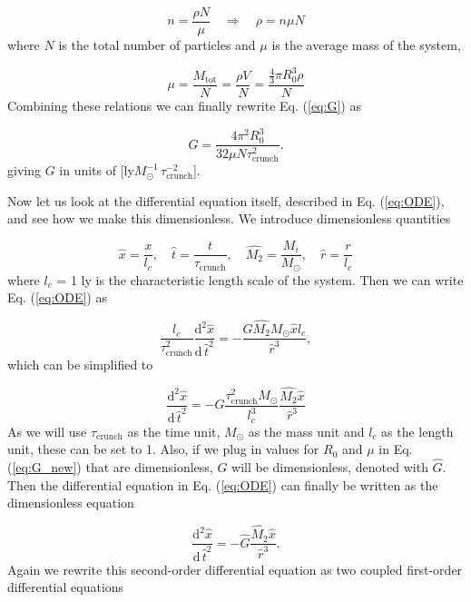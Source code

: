 \documentclass{article}
\begin{document}
\begin{multicols}{2}
\begin{equation*}
	n = \frac{\rho N}{\mu} \quad \Rightarrow \quad \rho = n \mu N
\end{equation*}
where $N$ is the total number of particles and $\mu$ is the average mass of the system,

\begin{equation*}
	\mu = \frac{M_{\mathrm{tot}}}{N} = \frac{\rho V}{N} = \frac{\frac{4}{3} \pi R_0^3 \rho}{N}
\end{equation*}
Combining these relations we can finally rewrite Eq. (\ref{eq:G}) as 

\begin{equation}\label{eq:G_new}
	G = \frac{4 \pi^2 R_0^3}{32 \mu N \tau_{\mathrm{crunch}}^2}.
\end{equation}
giving $G$ in units of [ly$M_{\odot}^{-1} \, \tau_{\mathrm{crunch}}^{-2}$].

Now let us look at the differential equation itself, described in Eq. (\ref{eq:ODE}), and see how we make this dimensionless. We introduce dimensionless quantities

\begin{equation*}
	\hat{x} = \frac{x}{l_c}, \quad \hat{t} = \frac{t}{\tau_{\mathrm{crunch}}}, \quad \hat{M_2} = \frac{M_i}{M_{\odot}}, \quad \hat{r} = \frac{r}{l_c}
\end{equation*} 
where $l_c$ = 1 ly is the characteristic length scale of the system. Then we can write Eq. (\ref{eq:ODE}) as

\begin{equation*}
	\frac{l_c}{\tau_{\mathrm{crunch}}^2} \frac{\mathrm{d}^2 \hat{x}}{\mathrm{d} \, \hat{t}^2} = - \frac{G \hat{M_2} M_{\odot} \hat{x} l_c}{\hat{r}^3},
\end{equation*}
which can be simplified to

\begin{equation*}
	\frac{\mathrm{d}^2 \hat{x}}{\mathrm{d} \, \hat{t}^2} = - G \frac{\tau_{\mathrm{crunch}}^2 M_{\odot}}{l_c^3}  \frac{\hat{M_2} \hat{x}}{\hat{r}^3}
\end{equation*}
As we will use $\tau_{\mathrm{crunch}}$ as the time unit, $M_{\odot}$ as the mass unit and $l_c$ as the length unit, these can be set to 1. Also, if we plug in values for $R_0$ and $\mu$ in Eq. (\ref{eq:G_new}) that are dimensionless, $G$ will be dimensionless, denoted with $\hat{G}$. Then the differential equation in Eq. (\ref{eq:ODE}) can finally be written as the dimensionless equation

\begin{equation}\label{eq:ODE_new}
	\frac{\mathrm{d}^2 \hat{x}}{\mathrm{d} \, \hat{t}^2} = - \hat{G} \frac{\hat{M_2} \hat{x}}{\hat{r}^3}.
\end{equation}
Again we rewrite this second-order differential equation as two coupled first-order differential equations


\end{multicols}
\end{document}
